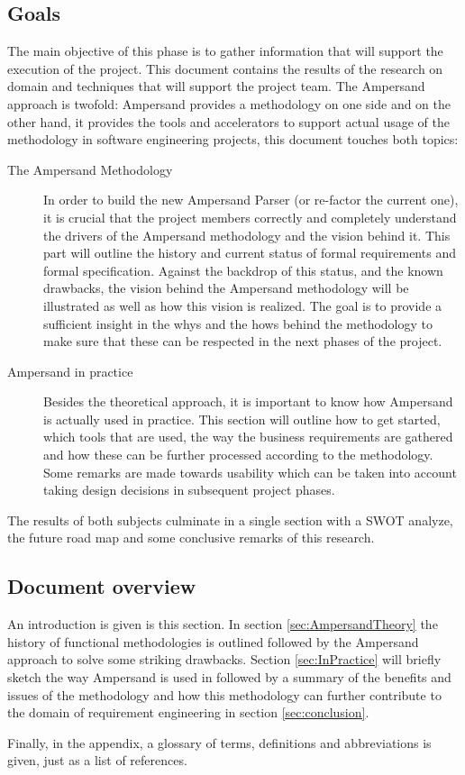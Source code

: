 \subsection{Goals}
The main objective of this phase is to gather information that will support the execution of the project.
This document contains the results of the research on domain and techniques that will support the project team.
The Ampersand approach is twofold: Ampersand provides a methodology on one side and on the other hand, it provides the tools and accelerators to support actual usage of the methodology in software engineering projects, this document touches both topics:
\begin{description}
	\item[The Ampersand Methodology]
	In order to build the new Ampersand Parser (or re-factor the current one), it is crucial that the project members correctly and completely understand the drivers of the Ampersand methodology and the vision behind it.
	This part will outline the history and current status of formal requirements and formal specification.
	 Against the backdrop of this status, and the known drawbacks, the vision behind the Ampersand methodology will be illustrated as well as how this vision is realized.
	The goal is to provide a sufficient insight in the whys and the hows behind the methodology to make sure that these can be respected in the next phases of the project.
	
	\item[Ampersand in practice]
	Besides the theoretical approach, it is important to know how Ampersand is actually used in practice. This section will outline how to get started, which tools that are used, the way the business requirements are gathered and how these can be further processed according to the methodology. Some remarks are made towards usability which can be taken into account taking design decisions in subsequent project phases.
	
\end{description}
%
The results of both subjects culminate in a single section with a SWOT analyze, the future road map and some conclusive remarks of this research.

\subsection{Document overview}
An introduction is given is this section.
In section \autoref{sec:AmpersandTheory} the history of functional methodologies is outlined followed by the Ampersand approach to solve some striking drawbacks.
Section \autoref{sec:InPractice} will briefly sketch the way Ampersand is used in followed by a summary of the benefits and issues of the methodology and how this methodology can further contribute to the domain of requirement engineering in section \autoref{sec:conclusion}.

Finally, in the appendix, a glossary of terms, definitions and abbreviations is given, just as a list of references.
